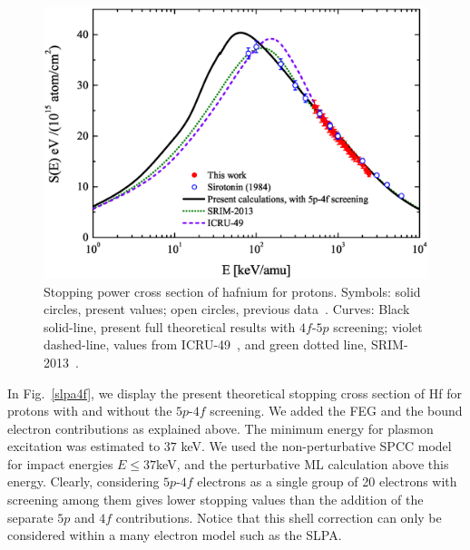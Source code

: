 \documentclass[aps,pra,reprint,groupedaddress,showpacs,showkeys]{revtex4-1} %
\providecommand{\DIFadd}[1]{{\protect\color{blue}\uwave{#1}}} %
\providecommand{\DIFaddbegin}{} %
\providecommand{\DIFaddend}{} %
\newcommand{\DIFaddincludegraphics}[2][]{{\color{blue}\fbox{\DIFOincludegraphics[#1]{#2}}}} %
\DeclareRobustCommand{\DIFaddbegin}{\DIFOaddbegin \let\includegraphics\DIFaddincludegraphics} %
\DeclareRobustCommand{\DIFaddend}{\DIFOaddend \let\includegraphics\DIFOincludegraphics} %
\begin{document}
\begin{figure}[!t]
\centering
\includegraphics[width=13.0cm]{Fig03.eps}
\caption{Stopping power cross section of hafnium for protons. Symbols: 
solid circles, present values; open circles, previous data~\cite{Sirotinin}. 
Curves: Black solid-line, present full theoretical results with 
$4f$-$5p$ screening; violet dashed-line, values from ICRU-49~\cite{ICRU49}, 
and green dotted line, SRIM-2013~\cite{Ziegler01}.}
\label{F03}
\end{figure}

In Fig.~\ref{slpa4f}, we display the present theoretical stopping cross 
section of Hf for protons with and without the $5p$-$4f$ screening. We 
added the FEG and the bound electron contributions as explained above. 
The minimum energy for plasmon excitation was estimated to $37$ keV. We 
used the non-perturbative SPCC model for impact energies $E \leq 37$\DIFaddbegin \DIFadd{~}\DIFaddend keV, 
and the perturbative ML calculation above this energy. %
Clearly, 
considering $5p$-$4f$ electrons as a single group of 20 electrons with 
screening among them gives lower stopping values than the addition of 
the separate $5p$ and $4f$ contributions. Notice that this shell 
correction can only be considered within a many electron model such as 
the SLPA.
\end{document}
